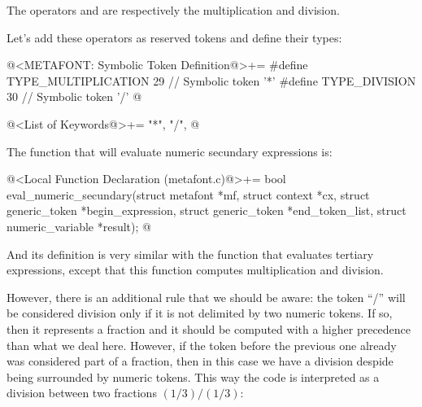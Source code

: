 The operators \monoespaco{*} and \monoespaco{/} are respectively the
multiplication and division.

Let's add these operators as reserved tokens and define their types:

\iniciocodigo
@<METAFONT: Symbolic Token Definition@>+=
#define TYPE_MULTIPLICATION        29 // Symbolic token '*'
#define TYPE_DIVISION              30 // Symbolic token '/'
@
\fimcodigo

\iniciocodigo
@<List of Keywords@>+=
"*", "/",
@
\fimcodigo

The function that will evaluate numeric secundary expressions is:

\iniciocodigo
@<Local Function Declaration (metafont.c)@>+=
bool eval_numeric_secundary(struct metafont *mf, struct context *cx,
                             struct generic_token *begin_expression,
                             struct generic_token *end_token_list,
                             struct numeric_variable *result);
@
\fimcodigo

And its definition is very similar with the function that evaluates
tertiary expressions, except that this function computes
multiplication and division.

However, there is an additional rule that we should be aware: the
token ``/'' will be considered division only if it is not delimited by
two numeric tokens. If so, then it represents a fraction and it should
be computed with a higher precedence than what we deal here. However,
if the token before the previous one already was considered part of a
fraction, then in this case we have a division despide being
surrounded by numeric tokens. This way the code 
is interpreted as a division between two fractions $(1/3)/(1/3)$:

